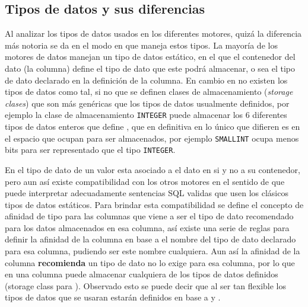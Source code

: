 \subsection{Tipos de datos y sus diferencias}
\label{subsection:datatypes}
Al analizar los tipos de datos usados en los diferentes motores, quizá la diferencia más notoria se da en el modo en que \s maneja estos tipos. La mayoría de los motores de datos manejan un tipo de datos estático, en el que el contenedor del dato (la columna) define el tipo de dato que este podrá almacenar, o sea el tipo de dato declarado en la definición de la columna. En cambio en \s no existen los tipos de datos como tal, si no que se definen clases de almacenamiento\cite{sqlite:datatypes} (\textit{storage clases}) que son más genéricas que los tipos de datos usualmente definidos, por ejemplo la clase de almacenamiento \verb=INTEGER= puede almacenar los 6 diferentes tipos de datos enteros que define \m , que en definitiva en lo único que difieren es en el espacio que ocupan para ser almacenados, por ejemplo \verb=SMALLINT= ocupa menos bits para ser representado que el tipo \verb=INTEGER=.

En \s el tipo de dato de un valor esta asociado a el dato en si y no a su contenedor, pero aun así existe compatibilidad con los otros motores en el sentido de que \s puede interpretar adecuadamente sentencias SQL validas que usen los clásicos tipos de datos estáticos. Para brindar esta compatibilidad se define el concepto de afinidad de tipo para las columnas que viene a ser el tipo de dato recomendado para los datos almacenados en esa columna, así existe una serie de reglas para definir la afinidad de la columna en base a el nombre del tipo de dato declarado para esa columna, pudiendo ser este nombre cualquiera. Aun así la afinidad de la columna \textbf{recomienda} un tipo de dato no lo exige para esa columna, por lo que en \s una columna puede almacenar cualquiera de los tipos de datos definidos (storage class para \s). Observado esto se puede decir que al ser \s tan flexible los tipos de datos que se usaran estarán definidos en base a \m y \p.
 

